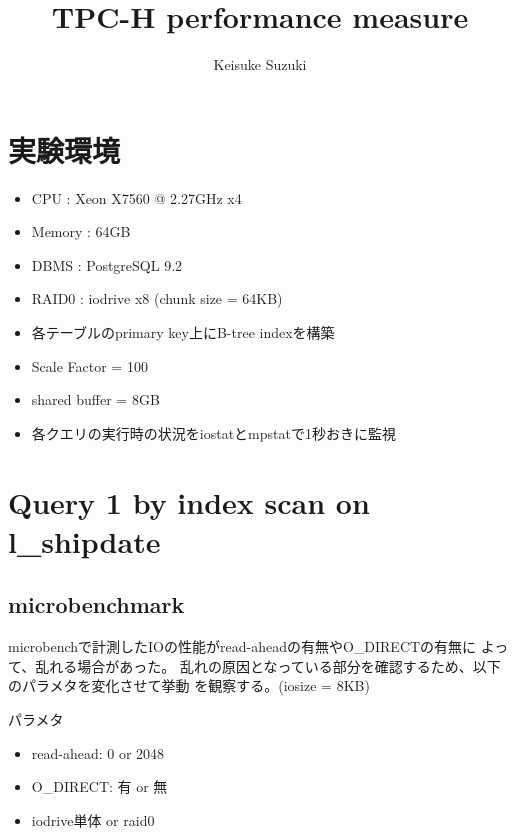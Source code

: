\documentclass[11pt,a4paper]{jsarticle}
\title{TPC-H performance measure}
\author{Keisuke Suzuki}
\begin{document}
\maketitle
\section{実験環境}
\begin{itemize}
 \item CPU : Xeon X7560 @ 2.27GHz x4
 \item Memory : 64GB
 \item DBMS : PostgreSQL 9.2
 \item RAID0 : iodrive x8 (chunk size = 64KB)
 \item 各テーブルのprimary key上にB-tree indexを構築
 \item Scale Factor = 100
 \item shared buffer = 8GB
 \item 各クエリの実行時の状況をiostatとmpstatで1秒おきに監視
\end{itemize}

\section{Query 1 by index scan on l\_shipdate}
\subsection{microbenchmark}
microbenchで計測したIOの性能がread-aheadの有無やO\_DIRECTの有無に
よって、乱れる場合があった。
乱れの原因となっている部分を確認するため、以下のパラメタを変化させて挙動
を観察する。(iosize = 8KB)

パラメタ
\begin{itemize}
 \item read-ahead: 0 or 2048
 \item O\_DIRECT: 有 or 無
 \item iodrive単体 or raid0
\end{itemize}

\clearpage
\end{document}
